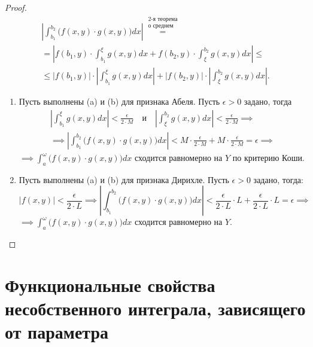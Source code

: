 \begin{proof}\leavevmode
    \begin{multline*}
        \left|\int_{b_1}^{b_2}\big(f(x,y)\cdot g(x,y)\big)dx\right| \overset{\begin{array}{c}
                \text{2-я теорема} \\
                \text{о среднем}
            \end{array}}{=} \\
        = \left|f(b_1,y)\cdot \int_{b_1}^{\xi}g(x,y)dx + f(b_2,y)\cdot \int_{\xi}^{b_2}g(x,y)dx\right| \leqslant \\
        \leqslant \left|f(b_1,y)\right| \cdot \left|\int_{b_1}^{\xi}g(x,y)dx\right| + \left|f(b_2,y)\right| \cdot \left|\int_{\xi}^{b_2}g(x,y)dx\right|.
    \end{multline*}

    \begin{enumerate}
        \item Пусть выполнены (a) и (b) для признака Абеля. Пусть $\epsilon > 0$ задано, тогда
              \begin{multline*}
                  \left|\int_{b_1}^{\xi}g(x,y)dx\right| < \frac{\epsilon}{2\cdot M} \quad\text{и}\quad \left|\int_{\xi}^{b_2}g(x,y)dx\right| < \frac{\epsilon}{2 \cdot M} \implies \\
                  \implies \left|\int_{b_1}^{b_2}\big(f(x,y)\cdot g(x,y)\big)dx \right| < M \cdot \frac{\epsilon}{2 \cdot M} + M \cdot \frac{\epsilon}{2 \cdot M} = \epsilon \implies
              \end{multline*}
              $\implies \int_{a}^{\omega}\big(f(x,y)\cdot g(x,y)\big)dx$ сходится равномерно на $Y$ по критерию Коши.
        \item Пусть выполнены (a) и (b) для признака Дирихле. Пусть $\epsilon > 0$ задано, тогда:
              \[
                  \left|f(x,y)\right| < \frac{\epsilon}{2\cdot L} \implies \left|\int_{b_1}^{b_2}\big(f(x,y)\cdot g(x,y)\big)dx\right| < \frac{\epsilon}{2\cdot L} \cdot L + \frac{\epsilon}{2 \cdot L} \cdot L = \epsilon \implies
              \]
              $\implies \int_{a}^{\omega}\big(f(x,y)\cdot g(x,y)\big)dx$ сходится равномерно на $Y$.
    \end{enumerate}
\end{proof}

\section{Функциональные свойства несобственного интеграла, зависящего от параметра}

